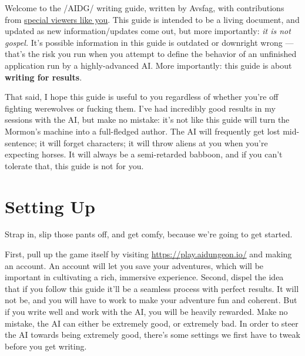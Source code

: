 \documentclass[Avsfag-main.tex]{subfiles}
\begin{document}

Welcome to the /AIDG/ writing guide, written by Avsfag, with contributions from
\href{https://www.google.com/search?q=Severely+autistic+children\&source=lnms\&tbm=isch\&sa=X\&ved=2ahUKEwjMyu-tpYXrAhWSGs0KHStBDwYQ_AUoAnoECA8QBA\&biw=1792\&bih=948\&dpr=2}{special viewers like you}.
This guide is intended to be a living document, and updated as new information/updates come out, but more importantly: \emph{it is not gospel.}
It's possible information in this guide is outdated or downright wrong --- that's the risk you run when you attempt to define the behavior of an unfinished application run by a highly-advanced AI.
More importantly: this guide is about \textbf{writing for results}.

That said, I hope this guide is useful to you regardless of whether you're off fighting werewolves or fucking them.
I've had incredibly good results in my sessions with the AI, but make no mistake: it's not like this guide will turn the Mormon's machine into a full-fledged author.
The AI will frequently get lost mid-sentence; it will forget characters; it will throw aliens at you when you're expecting horses.
It will always be a semi-retarded babboon, and if you can't tolerate that, this guide is not for you.

\chapter{Setting Up}

Strap in, slip those pants off, and get comfy, because we're going to get started.

First, pull up the game itself by visiting
\href{https://play.aidungeon.io/}{https://play.aidungeon.io/} and making an account.
An account will let you save your adventures, which will be important in cultivating a rich, immersive experience.
Second, dispel the idea that if you follow this guide it'll be a seamless process with perfect results.
It will not be, and you will have to work to make your adventure fun and coherent. But if you write well and work with the AI, you will be heavily rewarded.
Make no mistake, the AI can either be extremely good, or extremely bad.
In order to steer the AI towards being extremely good, there's some settings we first have to tweak before you get writing.
\end{document}
